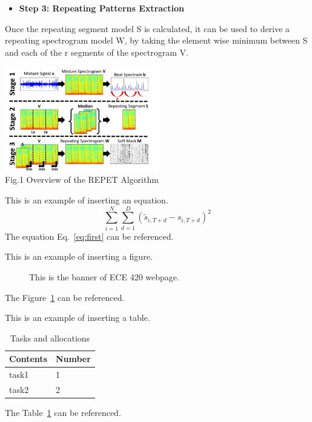 \documentclass[journal,onecolumn, draftclsnofoot, 12pt]{IEEEtran}
\begin{document}
\vspace{0.5cm}
\begin{itemize}
    \item \textbf{Step 3: Repeating Patterns Extraction} 
\end{itemize}
\begin{description}
   Once the repeating segment model S is calculated, it can be used to derive a repeating spectrogram model W, by taking the element wise minimum between S and each of the r segments of the spectrogram V. 
\end{description}


\vspace{0.8cm}
\begin{center}
\includegraphics[width=0.5\textwidth]{Figure1.png}\\
Fig.1 Overview of the REPET Algorithm
\end{center}



This is an example of inserting an equation. 
\begin{equation} \label{eq:first}
    \sum_{i=1}^N  \sum_{d=1}^D (\widetilde{s}_{i, T+d} - {s}_{i, T+d})^2
\end{equation}
The equation Eq.~\ref{eq:first} can be referenced. 


This is an example of inserting a figure. 
\begin{figure}[h]
\begin{center}
\caption{ This is the banner of ECE 420 webpage.  } 
\label{fig:banner}
\end{center}
\end{figure}
The Figure~\ref{fig:banner} can be referenced. 


This is an example of inserting a table.
\begin{table}[h]
\small
    \centering
    \begin{tabular}{|p{1.5in}|p{1.5in}|}
        \hline
        \textbf{Contents} & \textbf{Number} \\
         \hline
        task1 &  1\\
        \hline
        task2 &  2 \\
         \hline
         
    \end{tabular}
    \vspace{0.1in}
    \caption{Tasks and allocations}
    \label{tab:table}
\end{table}
The Table~\ref{tab:table} can be referenced. 
\end{document}
